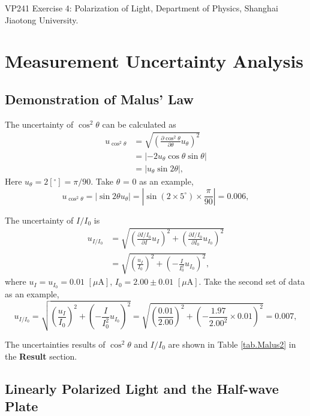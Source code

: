 \documentclass{article}
\begin{document}
\begin{thebibliography}{1}

 VP241 Exercise 4: Polarization of Light, Department of Physics, Shanghai Jiaotong University.

\end{thebibliography}

\newpage

\appendix

\section{Measurement Uncertainty Analysis}

\subsection{Demonstration of Malus' Law}

The uncertainty of $\cos^2\theta$ can be calculated as 
\begin{align*}
u_{\cos^{2}\theta}&=\sqrt{(\frac{\partial \cos^{2}\theta}{\partial \theta}u_{\theta})^{2}}\\
&=|-2u_{\theta}\cos\theta\sin\theta |\\
&=|u_{\theta} \sin2\theta|,
\end{align*}
Here $u_\theta = 2[^\circ] = \pi/90$. 
Take $\theta$ = 0 as an example, 
$$u_{\cos^{2}\theta}=|\sin2\theta u_{\theta}|=|\sin({2\times 5^\circ})\times \frac{\pi}{90}|=0.006,$$

The uncertainty of $I/I_0$ is 
\begin{align*}
u_{I/I_{0}}&=\sqrt{(\frac{\partial I/I_0}{\partial I}u_{I})^{2}+(\frac{\partial I/I_0}{\partial I_{0}}u_{I_{0}})^{2}}\\
&=\sqrt{(\frac{u_{I}}{I_{0}})^{2}+(-\frac{I}{I_{0}^{2}}u_{I_{0}})^{2}},
\end{align*}
where $u_I = u_{I_0} = 0.01\,\,[\mu\text{A}]$, $I_0 = 2.00 \pm 0.01\,\,[\mu\text{A}]$. 
Take the second set of data as an example,
$$u_{I/I_{0}}= \sqrt{(\frac{u_{I}}{I_{0}})^{2}+(-\frac{I}{I_{0}^{2}}u_{I_{0}})^{2}}=\sqrt{(\frac{0.01}{2.00})^{2}+(-\frac{1.97}{2.00^{2}}\times 0.01)^{2}}=0.007,$$

The uncertainties results of $\cos^2\theta$ and $I/I_0$ are shown in Table \ref{tab.Malus2} in the \textbf{Result} section.


\subsection{Linearly Polarized Light and the Half-wave Plate}
\end{document}

